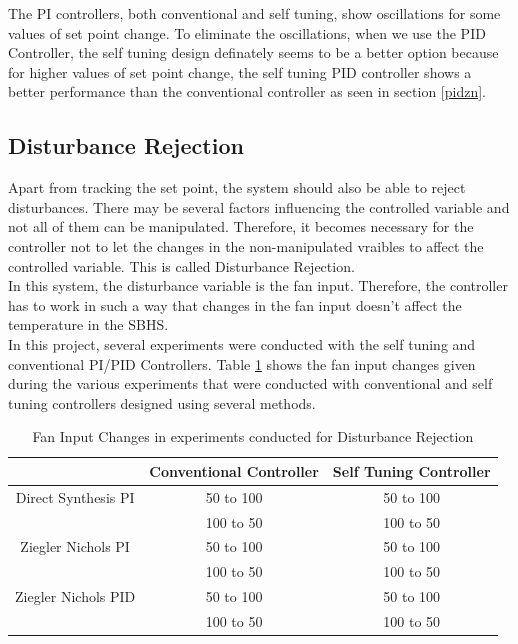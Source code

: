 The PI controllers, both conventional and self tuning, show oscillations for some values of set point change. To eliminate the oscillations, when we use the PID Controller, the self tuning design definately seems to be a better option because for higher values of set point change, the self tuning PID controller shows a better performance than the conventional controller as seen in section \ref{pidzn}.

\subsection{Disturbance Rejection}

Apart from tracking the set point, the system should also be able to reject disturbances. There may be several factors influencing the controlled variable and not all of them can be manipulated. Therefore, it becomes necessary for the controller not to let the changes in the non-manipulated vraibles to affect the controlled variable. This is called Disturbance Rejection.\\

In this system, the disturbance variable is the fan input. Therefore, the controller has to work in such a way that changes in the fan input doesn't affect the temperature in the SBHS.\\

In this project, several experiments were conducted with the self tuning and conventional PI/PID Controllers. Table \ref{dist} shows the fan input changes given during the various experiments that were conducted with conventional and self tuning controllers designed using several methods.\\
\begin{table}[h]
	\centering
		\begin{tabular}{||c|c|c|}\hline
			&Conventional Controller&Self Tuning Controller\\\hline \hline
		Direct Synthesis PI&50 to 100&50 to 100\\
											 &100 to 50&100 to 50\\\hline
		Ziegler Nichols PI &50 to 100&50 to 100\\
												&100 to 50&100 to 50 \\\hline
		Ziegler Nichols PID&50 to 100&50 to 100\\
												&100 to 50&100 to 50\\\hline
		\end{tabular}
	\caption{Fan Input Changes in experiments conducted for Disturbance Rejection}
	\label{dist}
\end{table}


